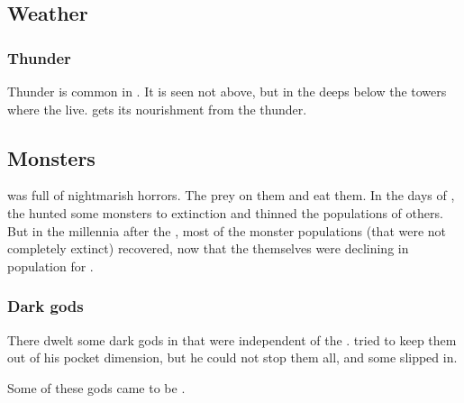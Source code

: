 




\subsection{Weather}





\subsubsection{Thunder}
Thunder is common in \Nyx.
It is seen not above, but in the deeps below the towers where the \resphain live. 
 gets its nourishment from the thunder. 









\subsection{Monsters}
\Nyx{} was full of nightmarish horrors. 
The \resphain{} prey on them and eat them. 
In the days of \Merkyrah, the \resphain{} hunted some monsters to extinction and thinned the populations of others. 
But in the millennia after the , most of the monster populations (that were not completely extinct) recovered, now that the \resphain{} themselves were declining in population for . 





\subsubsection{Dark gods}
There dwelt some dark gods in \Nyx{} that were independent of the \banes. 
\Daggerrain{} tried to keep them out of his pocket dimension, but he could not stop them all, and some slipped in. 

Some of these gods came to be . 

